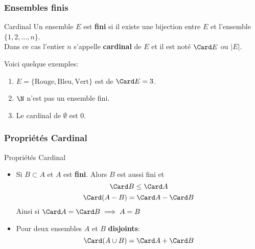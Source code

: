 \begin{frame}[<+->]
  \frametitle{Ensembles finis}
  \begin{block}{Cardinal}
    Un ensemble $E$ est \textbf{\alert{fini}} si il existe une bijection entre
    $E$ et l'ensemble $\{1,2,\ldots, n\}$.\\[4pt]

    Dans ce cas l'entier $n$ s'appelle \alert{\textbf{cardinal}} de $E$ et il est
    noté $\Card E$ ou $\vert E\vert$.
  \end{block}
  
  Voici quelque exemples:
  \begin{enumerate}
    \item $E = \{\text{Rouge}, \text{Bleu}, \text{Vert}\}$ est de $\Card
      E=3$.\\[4pt]
    \item $\N$ n'est pas un ensemble fini.\\[4pt]
    \item Le cardinal de $\emptyset$ est $0$.\\[4pt]
  \end{enumerate}
\end{frame}
\begin{frame}[<+->]
  \frametitle{Propriétés Cardinal}
 \begin{block}{Propriétés Cardinal}
   \begin{itemize}
     \item Si $B\subset A$ et $A$ est \textbf{fini}. Alors $B$ est aussi fini et 
       \begin{equation}
         \Card B \leq \Card A
       \end{equation}
      \begin{equation}
        \Card (A-B) =\Card A - \Card B
      \end{equation}
      Ainsi si $\Card A = \Card B  \implies A = B$\\[8pt]
    \item Pour deux ensembles $A$ et $B$ \textbf{\alert{disjoints}}:
      \begin{equation}
        \Card(A\cup B) = \Card A + \Card B
      \end{equation}
  \end{itemize} 
 \end{block} 
\end{frame}
